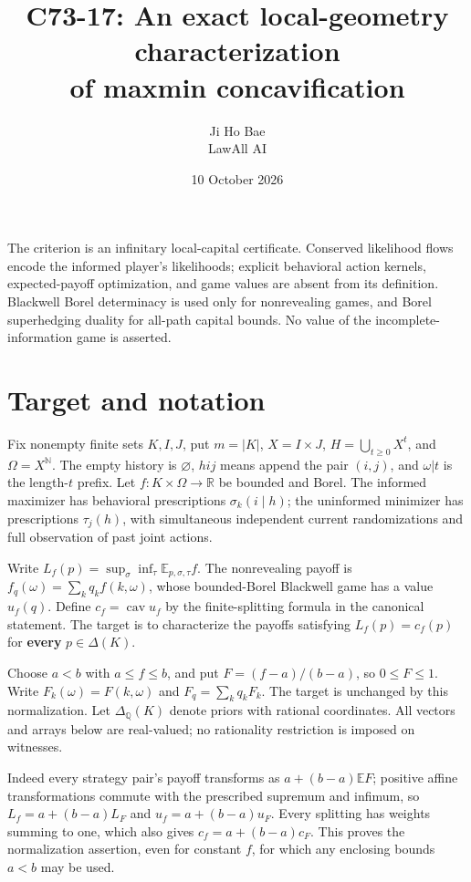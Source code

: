 \documentclass[11pt,a4paper]{article}
\title{C73-17: An exact local-geometry characterization\\of maxmin concavification}
\author{Ji Ho Bae\\\small LawAll AI}
\date{10 October 2026}
\begin{document}
\maketitle

The criterion is an infinitary local-capital certificate. Conserved likelihood
flows encode the informed player's likelihoods; explicit behavioral action
kernels, expected-payoff optimization, and game values are absent from its
definition. Blackwell Borel determinacy is used only for nonrevealing games,
and Borel superhedging duality for all-path capital bounds. No value of the
incomplete-information game is asserted.

\section{Target and notation}

Fix nonempty finite sets \(K,I,J\), put \(m=|K|\), \(X=I\times J\), \(H=\bigcup_{t\ge0}X^t\), and \(\Omega=X^{\mathbb N}\). The empty history is \(\varnothing\), \(hij\) means append the pair \((i,j)\), and \(\omega|t\) is the length-\(t\) prefix. Let \(f:K\times\Omega\to\mathbb R\) be bounded and Borel. The informed maximizer has behavioral prescriptions \(\sigma_k(i\mid h)\); the uninformed minimizer has prescriptions \(\tau_j(h)\), with simultaneous independent current randomizations and full observation of past joint actions.

Write \(L_f(p)=\sup_\sigma\inf_\tau\mathbb E_{p,\sigma,\tau} f\). The nonrevealing payoff is \(f_q(\omega)=\sum_kq_k f(k,\omega)\), whose bounded-Borel Blackwell game has a value \(u_f(q)\). Define \(c_f=\operatorname{cav}u_f\) by the finite-splitting formula in the canonical statement. The target is to characterize the payoffs satisfying \(L_f(p)=c_f(p)\) for \textbf{every} \(p\in\Delta(K)\).

Choose \(a<b\) with \(a\le f\le b\), and put \(F=(f-a)/(b-a)\), so \(0\le F\le1\). Write \(F_k(\omega)=F(k,\omega)\) and \(F_q=\sum_kq_kF_k\). The target is unchanged by this normalization. Let \(\Delta_{\mathbb Q}(K)\) denote priors with rational coordinates. All vectors and arrays below are real-valued; no rationality restriction is imposed on witnesses.

Indeed every strategy pair's payoff transforms as \(a+(b-a)\mathbb E F\); positive affine transformations commute with the prescribed supremum and infimum, so \(L_f=a+(b-a)L_F\) and \(u_f=a+(b-a)u_F\). Every splitting has weights summing to one, which also gives \(c_f=a+(b-a)c_F\). This proves the normalization assertion, even for constant \(f\), for which any enclosing bounds \(a<b\) may be used.
\end{document}
